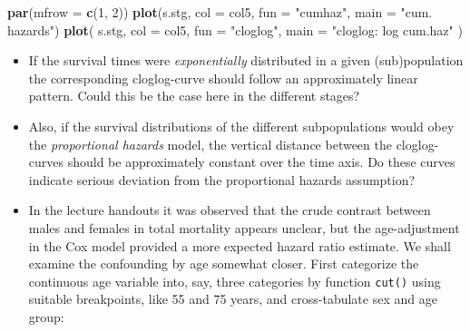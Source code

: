 \documentclass[
]{book}
\newenvironment{Shaded}{\begin{snugshade}}{\end{snugshade}}
\newcommand{\AttributeTok}[1]{\textcolor[rgb]{0.13,0.29,0.53}{#1}}
\newcommand{\ConstantTok}[1]{\textcolor[rgb]{0.56,0.35,0.01}{#1}}
\newcommand{\DecValTok}[1]{\textcolor[rgb]{0.00,0.00,0.81}{#1}}
\newcommand{\FunctionTok}[1]{\textcolor[rgb]{0.13,0.29,0.53}{\textbf{#1}}}
\newcommand{\NormalTok}[1]{#1}
\newcommand{\OtherTok}[1]{\textcolor[rgb]{0.56,0.35,0.01}{#1}}
\newcommand{\SpecialCharTok}[1]{\textcolor[rgb]{0.81,0.36,0.00}{\textbf{#1}}}
\newcommand{\StringTok}[1]{\textcolor[rgb]{0.31,0.60,0.02}{#1}}
\begin{document}
\begin{Shaded}
\begin{Highlighting}[]
\FunctionTok{par}\NormalTok{(}\AttributeTok{mfrow =} \FunctionTok{c}\NormalTok{(}\DecValTok{1}\NormalTok{, }\DecValTok{2}\NormalTok{))}
\FunctionTok{plot}\NormalTok{(s.stg, }\AttributeTok{col =}\NormalTok{ col5, }\AttributeTok{fun =} \StringTok{"cumhaz"}\NormalTok{, }\AttributeTok{main =} \StringTok{"cum. hazards"}\NormalTok{)}
\FunctionTok{plot}\NormalTok{(}
\NormalTok{  s.stg, }
  \AttributeTok{col =}\NormalTok{ col5, }
  \AttributeTok{fun =} \StringTok{"cloglog"}\NormalTok{, }
  \AttributeTok{main =} \StringTok{"cloglog: log cum.haz"}
\NormalTok{)}
\end{Highlighting}
\end{Shaded}

\begin{itemize}
\item
  If the survival times were \emph{exponentially}
  distributed in a given (sub)population
  the corresponding cloglog-curve should follow an approximately linear pattern.
  Could this be the case here in the different stages?
\item
  Also, if the survival distributions of the different subpopulations would
  obey the \emph{proportional hazards} model, the vertical distance between the
  cloglog-curves should be approximately constant over the time axis.
  Do these curves indicate serious deviation from the proportional hazards assumption?
\item
  In the lecture handouts it was observed that
  the crude contrast between males and females in total mortality appears
  unclear, but the age-adjustment in the Cox model provided a more
  expected hazard ratio estimate.
  We shall examine the confounding by age somewhat closer.
  First categorize the continuous age variable
  into, say, three categories by function \texttt{cut()}
  using suitable breakpoints, like 55 and 75 years, and
  cross-tabulate sex and age group:
\end{itemize}

\begin{Shaded}
\end{Shaded}
\end{document}
